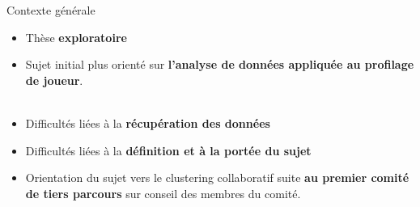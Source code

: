 \documentclass[hyperref={pdfpagelabels=false}]{beamer}
\begin{document}
    \begin{frame}{Contexte générale}
        \begin{itemize}
            \item Thèse \textbf{exploratoire}
            \item Sujet initial plus orienté sur \textbf{l'analyse de données 
                appliquée au profilage de joueur}.\\~\\
            \item Difficultés liées à la \textbf{récupération des données}
            \item Difficultés liées à la \textbf{définition et à la portée du 
                sujet}
            \item Orientation du sujet vers le clustering collaboratif suite 
                \textbf{au premier comité de tiers parcours} sur conseil des 
                membres du comité.
        \end{itemize}
    \end{frame}
\end{document}
